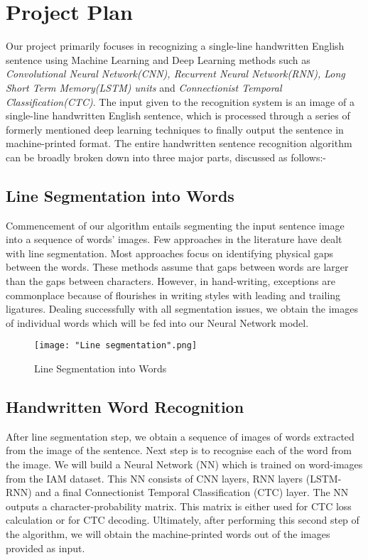 \documentclass[a4paper, 12pt]{article}
\begin{document}
\section{Project Plan}
Our project primarily focuses in recognizing a single-line handwritten English sentence using Machine Learning and Deep Learning methods such as \emph{Convolutional Neural Network(CNN), Recurrent Neural Network(RNN), Long Short Term Memory(LSTM) units} and \emph{Connectionist Temporal Classification(CTC)}. The input given to the recognition system is an image of a single-line handwritten English sentence, which is processed through a series of formerly mentioned deep learning techniques to finally output the sentence in machine-printed format. The entire handwritten sentence recognition algorithm can be broadly broken down into three major parts, discussed as follows:-
\subsection{Line Segmentation into Words}
Commencement of our algorithm entails segmenting the input sentence image into a sequence of words' images. Few approaches in the literature have dealt with line segmentation. Most approaches focus on identifying physical gaps between the words. These methods assume that gaps between words are larger than the gaps between characters. However, in hand-writing, exceptions are commonplace because of flourishes in writing styles with leading and trailing ligatures. Dealing successfully with all segmentation issues, we obtain the images of individual words which will be fed into our Neural Network model.

\begin{figure}[h]
\centering
\texttt{[image: "Line segmentation".png]}
\caption{Line Segmentation into Words}
\end{figure}

\subsection{Handwritten Word Recognition}
After line segmentation step, we obtain a sequence of images of words extracted from the image of the sentence. Next step is to recognise each of the word from the image. We will build a Neural Network (NN) which is trained on word-images from the IAM dataset. This NN consists of CNN layers, RNN layers (LSTM-RNN) and a final Connectionist Temporal Classification (CTC) layer. The NN outputs a character-probability matrix. This matrix is either used for CTC loss calculation or for CTC decoding. Ultimately, after performing this second step of the algorithm, we will obtain the machine-printed words out of the images provided as input.
\end{document}
